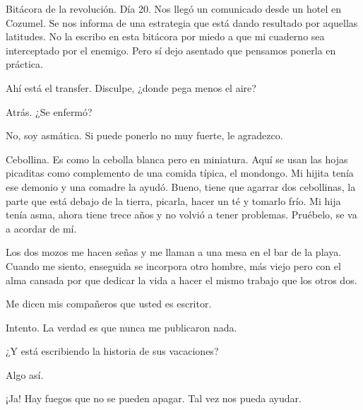 \documentclass[12pt,twoside,openright,a5paper]{book}
\begin{document}
Bitácora de la revolución. Día 20. Nos llegó un comunicado desde un
hotel en Cozumel. Se nos informa de una estrategia que está dando resultado
por aquellas latitudes. No la escribo en esta bitácora por miedo a que
mi cuaderno sea interceptado por el enemigo. Pero sí dejo asentado que
pensamos ponerla en práctica.


\vspace{0.5cm}
\hrulefill\hspace{0.2cm} \decofourleft\decofourright \hspace{0.2cm} \hrulefill
\vspace{0.5cm}

Ahí está el transfer. Disculpe, ¿donde pega menos el aire?

Atrás. ¿Se enfermó?

No, soy asmática. Si puede ponerlo no muy fuerte, le agradezco.

Cebollina. Es como la cebolla blanca pero en miniatura. Aquí se usan las
hojas picaditas como complemento de una comida típica, el mondongo. Mi
hijita tenía ese demonio y una comadre la ayudó. Bueno, tiene que agarrar
dos cebollinas, la parte que está debajo de la tierra, picarla, hacer
un té y tomarlo frío. Mi hija tenía asma, ahora tiene trece años y no
volvió a tener problemas. Pruébelo, se va a acordar de mí.


\vspace{0.5cm}
\hrulefill\hspace{0.2cm} \decofourleft\decofourright \hspace{0.2cm} \hrulefill
\vspace{0.5cm}

Los dos mozos me hacen señas y me llaman a una mesa en el bar de la
playa. Cuando me siento, enseguida se incorpora otro hombre, más viejo
pero con el alma cansada por que dedicar la vida a hacer el mismo trabajo
que los otros dos.

Me dicen mis compañeros que usted es escritor.

Intento. La verdad es que nunca me publicaron nada.

¿Y está escribiendo la historia de sus vacaciones?

Algo así.

¡Ja! Hay fuegos que no se pueden apagar. Tal vez nos pueda ayudar.



\vspace{0.5cm}
\hrulefill\hspace{0.2cm} \decofourleft\decofourright \hspace{0.2cm} \hrulefill
\vspace{0.5cm}
\end{document}

